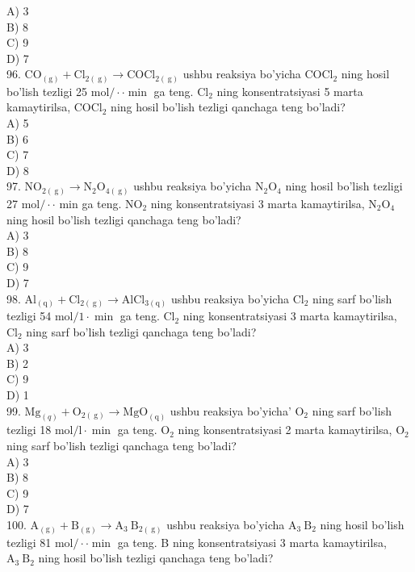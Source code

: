 A) 3\\
B) 8\\
C) 9\\
D) 7\\
96. $\mathrm{CO}_{(\mathrm{g})}+\mathrm{Cl}_{2(\mathrm{~g})} \rightarrow \mathrm{COCl}_{2(\mathrm{~g})}$ ushbu reaksiya bo'yicha $\mathrm{COCl}_{2}$ ning hosil bo'lish tezligi 25 $\mathrm{mol} / \cdot \cdot \min$ ga teng. $\mathrm{Cl}_{2}$ ning konsentratsiyasi 5 marta kamaytirilsa, $\mathrm{COCl}_{2}$ ning hosil bo'lish tezligi qanchaga teng bo'ladi?\\
A) 5\\
B) 6\\
C) 7\\
D) 8\\
97. $\mathrm{NO}_{2(\mathrm{~g})} \rightarrow \mathrm{N}_{2} \mathrm{O}_{4(\mathrm{~g})}$ ushbu reaksiya bo'yicha $\mathrm{N}_{2} \mathrm{O}_{4}$ ning hosil bo'lish tezligi 27 $\mathrm{mol} / \cdot \cdot$ min ga teng. $\mathrm{NO}_{2}$ ning konsentratsiyasi 3 marta kamaytirilsa, $\mathrm{N}_{2} \mathrm{O}_{4}$ ning hosil bo'lish tezligi qanchaga teng bo'ladi?\\
A) 3\\
B) 8\\
C) 9\\
D) 7\\
98. $\mathrm{Al}_{(\mathrm{q})}+\mathrm{Cl}_{2(\mathrm{~g})} \rightarrow \mathrm{AlCl}_{3(\mathrm{q})}$ ushbu reaksiya bo'yicha $\mathrm{Cl}_{2}$ ning sarf bo'lish tezligi 54 $\mathrm{mol} / 1 \cdot \min$ ga teng. $\mathrm{Cl}_{2}$ ning konsentratsiyasi 3 marta kamaytirilsa, $\mathrm{Cl}_{2}$ ning sarf bo'lish tezligi qanchaga teng bo'ladi?\\
A) 3\\
B) 2\\
C) 9\\
D) 1\\
99. $\mathrm{Mg}_{(q)}+\mathrm{O}_{2(\mathrm{~g})} \rightarrow \mathrm{MgO}_{(\mathrm{q})}$ ushbu reaksiya bo'yicha' $\mathrm{O}_{2}$ ning sarf bo'lish tezligi 18 $\mathrm{mol} / \mathrm{l} \cdot \min$ ga teng. $\mathrm{O}_{2}$ ning konsentratsiyasi 2 marta kamaytirilsa, $\mathrm{O}_{2}$ ning sarf bo'lish tezligi qanchaga teng bo'ladi?\\
A) 3\\
B) 8\\
C) 9\\
D) 7\\
100. $\mathrm{A}_{(\mathrm{g})}+\mathrm{B}_{(\mathrm{g})} \rightarrow \mathrm{A}_{3} \mathrm{~B}_{2(\mathrm{~g})}$ ushbu reaksiya bo'yicha $\mathrm{A}_{3} \mathrm{~B}_{2}$ ning hosil bo'lish tezligi 81 $\mathrm{mol} / \cdot \cdot \min$ ga teng. B ning konsentratsiyasi 3 marta kamaytirilsa, $\mathrm{A}_{3} \mathrm{~B}_{2}$ ning hosil bo'lish tezligi qanchaga teng bo'ladi?\\
